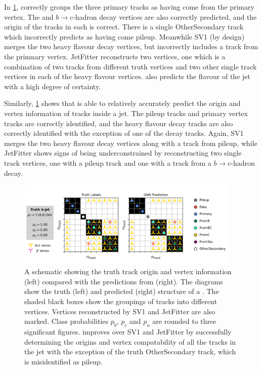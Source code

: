 In \cref{fig:bjet_diag_1}, \GNN correctly groups the three primary tracks as having come from the primary vertex.
The \bhadron and $b\rightarrow c$-hadron decay vertices are also correctly predicted, and the origin of the tracks in each is correct.
There is a single OtherSecondary track which \GNN incorrectly predicts as having come pileup.
Meanwhile SV1 (by design) merges the two heavy flavour decay vertices, but incorrectly includes a track from the primnary vertex.
JetFitter reconstructs two vertices, one which is a combination of two tracks from different truth vertices and two other single track vertices in each of the heavy flavour vertices.
\GNN also predicts the flavour of the jet with a high degree of certainty.

Similarly, \cref{fig:bjet_diag_1} shows that \GNN is able to relatively accurately predict the origin and vertex information of tracks inside a jet.
The pileup tracks and primary vertex tracks are correctly identified, and the heavy flavour decay tracks are also correctly identified with the exception of one of the \bhadron decay tracks.
Again, SV1 merges the two heavy flavour decay vertices along with a track from pileup, while JetFitter shows signs of being underconstrained by reconstructing two single track vertices, one with a pileup track and one with a track from a $b\rightarrow c$-hadron decay.

\begin{figure}[!p]
    \centering
    \includegraphics[width=0.95\textwidth]{chapters/gnn_tagger/figs/bjet_vertex.pdf}
    \caption{
        A schematic showing the truth track origin and vertex information (left) compared with the predictions from \GNN (right).
        The diagrams show the truth (left) and predicted (right) structure of a \bjet.
        The shaded black boxes show the groupings of tracks into different vertices.
        Vertices reconstructed by SV1 and JetFitter are also marked.
        Class probabilities $p_b$, $p_c$ and $p_u$ are rounded to three significant figures.
        \GNN improves over SV1 and JetFitter by successfully determining the origins and vertex compatability of all the tracks in the jet with the exception of the truth OtherSecondary track, which is misidentified as pileup.
    }
    \label{fig:bjet_diag_1}
 \end{figure}

